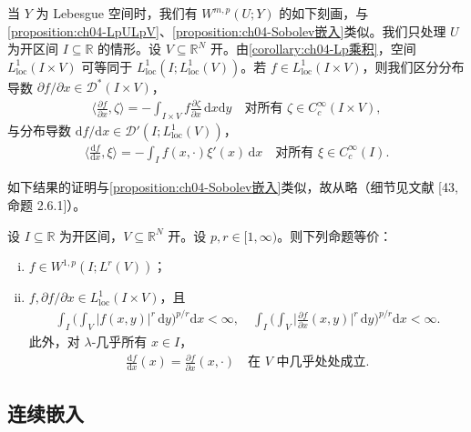 \documentclass[../../main.tex]{subfiles}%
\begin{document}
当 $Y$ 为 Lebesgue 空间时，我们有 $W^{m,p}(U;Y)$ 的如下刻画，与\cref{proposition:ch04-LpULpV}、\cref{proposition:ch04-Sobolev嵌入}类似。我们只处理 $U$ 为开区间 $I\subseteq\mathbb{R}$ 的情形。设 $V\subseteq\mathbb{R}^N$ 开。由\cref{corollary:ch04-Lp乘积}，空间 $L^1_{\mathrm{loc}}(I\times V)$ 可等同于 $L^1_{\mathrm{loc}}(I;L^1_{\mathrm{loc}}(V))$。若 $f\in L^1_{\mathrm{loc}}(I\times V)$，则我们区分分布导数 $\partial f/\partial x\in\mathcal{D}^*(I\times V)$，
\begin{align}
\Big\langle\frac{\partial f}{\partial x},\zeta\Big\rangle=-\int_{I\times V}f\frac{\partial\zeta}{\partial x}\,\mathrm{d}x\mathrm{d}y\quad\text{对所有 }\zeta\in C_c^\infty(I\times V), \label{align:ch04-4.126}
\end{align}
与分布导数 $\mathrm{d}f/\mathrm{d}x\in\mathcal{D}'(I;L^1_{\mathrm{loc}}(V))$，
\begin{align}
\Big\langle\frac{\mathrm{d}f}{\mathrm{d}x},\xi\Big\rangle=-\int_I f(x,\cdot)\xi'(x)\,\mathrm{d}x\quad\text{对所有 }\xi\in C_c^\infty(I). \label{align:ch04-4.127}
\end{align}

如下结果的证明与\cref{proposition:ch04-Sobolev嵌入}类似，故从略（细节见文献 [43, 命题 2.6.1]）。

\begin{proposition}\label{proposition:ch04-区间Sobolev}
设 $I\subseteq\mathbb{R}$ 为开区间，$V\subseteq\mathbb{R}^N$ 开。设 $p,r\in[1,\infty)$。则下列命题等价：
\begin{enumerate}[(i)]
\item\label{item:ch04-区间Sobolev-i} $f\in W^{1,p}(I;L^r(V))$；
\item\label{item:ch04-区间Sobolev-ii} $f,\partial f/\partial x\in L^1_{\mathrm{loc}}(I\times V)$，且
\begin{align}
\int_I\Big(\int_V|f(x,y)|^r\,\mathrm{d}y\Big)^{p/r}\mathrm{d}x<\infty,\quad
\int_I\Big(\int_V\Big|\frac{\partial f}{\partial x}(x,y)\Big|^r\,\mathrm{d}y\Big)^{p/r}\mathrm{d}x<\infty. \label{align:ch04-4.128}
\end{align}
此外，对 $\lambda$-几乎所有 $x\in I$，
\begin{align}
\frac{\mathrm{d}f}{\mathrm{d}x}(x)=\frac{\partial f}{\partial x}(x,\cdot)\quad\text{在 }V\text{ 中几乎处处成立}. \label{align:ch04-4.129}
\end{align}
\end{enumerate}
\end{proposition}

\subsection{连续嵌入}\label{subsection:ch04-连续嵌入}
\end{document}
